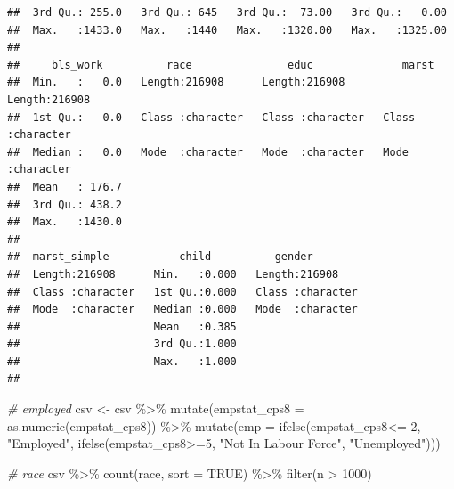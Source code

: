 \documentclass[
]{article}
\newenvironment{Shaded}{\begin{snugshade}}{\end{snugshade}}
\newcommand{\AttributeTok}[1]{\textcolor[rgb]{0.77,0.63,0.00}{#1}}
\newcommand{\CommentTok}[1]{\textcolor[rgb]{0.56,0.35,0.01}{\textit{#1}}}
\newcommand{\ConstantTok}[1]{\textcolor[rgb]{0.00,0.00,0.00}{#1}}
\newcommand{\DecValTok}[1]{\textcolor[rgb]{0.00,0.00,0.81}{#1}}
\newcommand{\FunctionTok}[1]{\textcolor[rgb]{0.00,0.00,0.00}{#1}}
\newcommand{\NormalTok}[1]{#1}
\newcommand{\OtherTok}[1]{\textcolor[rgb]{0.56,0.35,0.01}{#1}}
\newcommand{\SpecialCharTok}[1]{\textcolor[rgb]{0.00,0.00,0.00}{#1}}
\newcommand{\StringTok}[1]{\textcolor[rgb]{0.31,0.60,0.02}{#1}}
\begin{document}
\begin{verbatim}
##  3rd Qu.: 255.0   3rd Qu.: 645   3rd Qu.:  73.00   3rd Qu.:   0.00  
##  Max.   :1433.0   Max.   :1440   Max.   :1320.00   Max.   :1325.00  
##                                                                     
##     bls_work          race               educ              marst          
##  Min.   :   0.0   Length:216908      Length:216908      Length:216908     
##  1st Qu.:   0.0   Class :character   Class :character   Class :character  
##  Median :   0.0   Mode  :character   Mode  :character   Mode  :character  
##  Mean   : 176.7                                                           
##  3rd Qu.: 438.2                                                           
##  Max.   :1430.0                                                           
##                                                                           
##  marst_simple           child          gender         
##  Length:216908      Min.   :0.000   Length:216908     
##  Class :character   1st Qu.:0.000   Class :character  
##  Mode  :character   Median :0.000   Mode  :character  
##                     Mean   :0.385                     
##                     3rd Qu.:1.000                     
##                     Max.   :1.000                     
## 
\end{verbatim}

\begin{Shaded}
\begin{Highlighting}[]
\CommentTok{\# employed}
\NormalTok{csv }\OtherTok{\textless{}{-}}\NormalTok{ csv }\SpecialCharTok{\%\textgreater{}\%}
  \FunctionTok{mutate}\NormalTok{(}\AttributeTok{empstat\_cps8 =} \FunctionTok{as.numeric}\NormalTok{(empstat\_cps8)) }\SpecialCharTok{\%\textgreater{}\%}
  \FunctionTok{mutate}\NormalTok{(}\AttributeTok{emp =} \FunctionTok{ifelse}\NormalTok{(empstat\_cps8}\SpecialCharTok{\textless{}=} \DecValTok{2}\NormalTok{, }\StringTok{"Employed"}\NormalTok{, }\FunctionTok{ifelse}\NormalTok{(empstat\_cps8}\SpecialCharTok{\textgreater{}=}\DecValTok{5}\NormalTok{, }\StringTok{"Not In Labour Force"}\NormalTok{, }\StringTok{"Unemployed"}\NormalTok{)))}

\CommentTok{\# race}
\NormalTok{csv }\SpecialCharTok{\%\textgreater{}\%}
  \FunctionTok{count}\NormalTok{(race, }\AttributeTok{sort =} \ConstantTok{TRUE}\NormalTok{) }\SpecialCharTok{\%\textgreater{}\%}
  \FunctionTok{filter}\NormalTok{(n }\SpecialCharTok{\textgreater{}} \DecValTok{1000}\NormalTok{)}
\end{Highlighting}
\end{Shaded}
\end{document}
